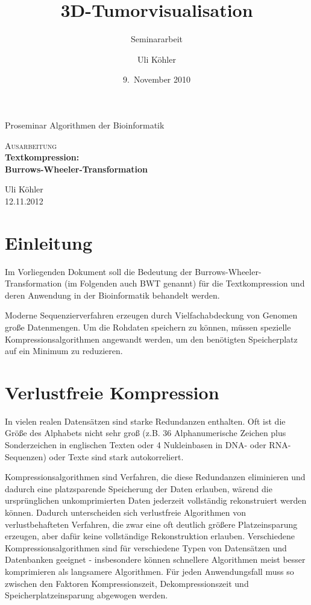 \documentclass[ngerman,pdftex,paper=A4,DIV=calc,titlepage,12pt]{scrartcl}
\title{3D-Tumorvisualisation}
\subtitle{Seminararbeit}
\author{Uli Köhler}
\date{9.~November 2010}
\newtheorem[L]{boxedDefinition}{Definition}
\begin{document}
\begin{titlepage}
\begin{center}
 Proseminar \glqq Algorithmen der Bioinformatik\grqq
 \end{center}
\vspace{2cm}
\begin{center}
 \large\textsc{Ausarbeitung}\\[5mm]
 {\Huge\centering\bfseries\selectfont Textkompression:\\Burrows-Wheeler-Transformation}\\[2cm]
\begin{center}
  Uli Köhler\\
  12.11.2012
\end{center}
\vspace{2cm}
\end{center}
\tableofcontents
\end{titlepage}
\section{Einleitung}
Im Vorliegenden Dokument soll die Bedeutung der Burrows-Wheeler-Transformation (im Folgenden auch BWT genannt) für die Textkompression und deren Anwendung in der Bioinformatik behandelt werden.

Moderne Sequenzierverfahren erzeugen durch Vielfachabdeckung von Genomen große Datenmengen. Um die Rohdaten speichern zu können, müssen spezielle Kompressionsalgorithmen angewandt werden, um den benötigten Speicherplatz auf ein Minimum zu reduzieren.
\section{Verlustfreie Kompression}
\label{ssec:bigdata-bioinformatics}
In vielen realen Datensätzen sind starke Redundanzen enthalten. Oft ist die Größe des Alphabets nicht sehr groß (z.B. 36 Alphanumerische Zeichen plus Sonderzeichen in englischen Texten oder 4 Nukleinbasen in DNA- oder RNA-Sequenzen) oder Texte sind stark autokorreliert.

Kompressionsalgorithmen sind Verfahren, die diese Redundanzen eliminieren und dadurch eine platzsparende Speicherung der Daten erlauben, wärend die ursprünglichen unkomprimierten Daten jederzeit vollständig rekonstruiert werden können.
Dadurch unterscheiden sich verlustfreie Algorithmen von verlustbehafteten Verfahren, die zwar eine oft deutlich größere Platzeinsparung erzeugen, aber dafür keine vollständige Rekonstruktion erlauben.
Verschiedene Kompressionsalgorithmen sind für verschiedene Typen von Datensätzen und Datenbanken geeignet - insbesondere können schnellere Algorithmen meist besser komprimieren als langsamere Algorithmen. Für jeden Anwendungsfall muss so zwischen den Faktoren Kompressionszeit, Dekompressionszeit und Speicherplatzeinsparung abgewogen werden.
\end{document}
